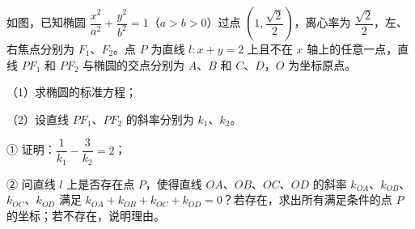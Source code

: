 \begingroup
\renewenvironment{question}{\Needspace{0.5\textheight}}{}
\begin{question}
如图，已知椭圆 $\dfrac{x^2}{a^2}+\dfrac{y^2}{b^2}=1$（$a>b>0$）过点 $\left(1,\dfrac{\sqrt2}2\right)$，离心率为 $\dfrac{\sqrt2}2$，左、右焦点分别为 $F_1$、$F_2$。点 $P$ 为直线 $l:x+y=2$ 上且不在 $x$ 轴上的任意一点，直线 $PF_1$ 和 $PF_2$ 与椭圆的交点分别为 $A$、$B$ 和 $C$、$D$，$O$ 为坐标原点。

（1）求椭圆的标准方程；

（2）设直线 $PF_1$、$PF_2$ 的斜率分别为 $k_1$、$k_2$。

① 证明：$\dfrac1{k_1}-\dfrac3{k_2}=2$；

② 问直线 $l$ 上是否存在点 $P$，使得直线 $OA$、$OB$、$OC$、$OD$ 的斜率 $k_{OA}$、$k_{OB}$、$k_{OC}$、$k_{OD}$ 满足 $k_{OA}+k_{OB}+k_{OC}+k_{OD}=0$？若存在，求出所有满足条件的点 $P$ 的坐标；若不存在，说明理由。
\nopagebreak[4]
\begin{center}\end{center}
\nopagebreak[4]

\end{question}
\endgroup
